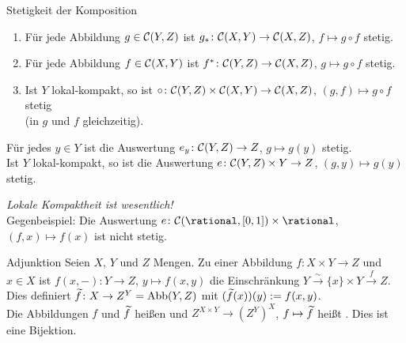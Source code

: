 \linie
\pagebreak

\begin{Satz}{Stetigkeit der Komposition}
    \begin{enumerate}
        \item
        Für jede Abbildung $g \in \mathcal{C}(Y, Z)$ ist
        $g_\ast\colon \mathcal{C}(X, Y) \rightarrow \mathcal{C}(X, Z)$, $f \mapsto g \circ f$
        stetig.
        
        \item
        Für jede Abbildung $f \in \mathcal{C}(X, Y)$ ist
        $f^\ast\colon \mathcal{C}(Y, Z) \rightarrow \mathcal{C}(X, Z)$, $g \mapsto g \circ f$
        stetig.
        
        \item
        Ist $Y$ lokal-kompakt, so ist
        $\circ\colon \mathcal{C}(Y, Z) \times \mathcal{C}(X, Y) \rightarrow \mathcal{C}(X, Z)$,
        $(g, f) \mapsto g \circ f$ stetig \\
        (in $g$ und $f$ gleichzeitig).
    \end{enumerate}
\end{Satz}

\begin{Kor}
    Für jedes $y \in Y$ ist die Auswertung
    $e_y\colon \mathcal{C}(Y, Z) \rightarrow Z$, $g \mapsto g(y)$ stetig. \\
    Ist $Y$ lokal-kompakt, so ist die Auswertung
    $e\colon \mathcal{C}(Y, Z) \times Y \rightarrow Z$, $(g, y) \mapsto g(y)$ stetig.
\end{Kor}

\begin{Bem}
    \emph{Lokale Kompaktheit ist wesentlich!} \\
    Gegenbeispiel: Die Auswertung
    $e\colon \C(\rational, [0, 1]) \times \rational$, $(f, x) \mapsto f(x)$
    ist nicht stetig.
\end{Bem}

\linie

\begin{Def}{Adjunktion}
    Seien $X$, $Y$ und $Z$ Mengen.
    Zu einer Abbildung $f\colon X \times Y \rightarrow Z$ und $x \in X$
    ist $f(x, -)\colon Y \rightarrow Z$, $y \mapsto f(x, y)$ die
    Einschränkung $Y \xrightarrow{\sim} \{x\} \times Y \xrightarrow{f} Z$. \\
    Dies definiert $\widetilde{f}\colon X \rightarrow Z^Y = \operatorname{Abb}(Y, Z)$ mit
    $(\widetilde{f}(x))(y) := f(x, y)$. \\
    Die Abbildungen $f$ und $\widetilde{f}$ heißen 
    und $Z^{X \times Y} \rightarrow (Z^Y)^X$, $f \mapsto \widetilde{f}$
    heißt .
    Dies ist eine Bijektion.
\end{Def}

